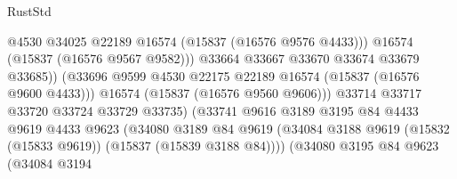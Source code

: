 \begin{lexlean}{RustStd}
\begin{coremodule}
{\begin{coremodule}
{{{{{{{{{{{{{{{{{{{{{{{{{{{{{{{{{{{{{{{{{{{{{{{{{{{{{{{{{{{{                                                @4530
                                                @34025
                                                @22189
                                                @16574
                                                (@15837 (@16576 @9576 @4433)))
                                              @16574
                                              (@15837 (@16576 @9567 @9582)))
                                            @33664
                                            @33667
                                            @33670
                                            @33674
                                            @33679
                                            @33685))
                                        (@33696
                                          @9599
                                          @4530
                                          @22175
                                          @22189
                                          @16574
                                          (@15837 (@16576 @9600 @4433)))
                                        @16574
                                        (@15837 (@16576 @9560 @9606)))
                                      @33714
                                      @33717
                                      @33720
                                      @33724
                                      @33729
                                      @33735)
                                    (@33741
                                      @9616
                                      @3189
                                      @3195
                                      @84
                                      @4433
                                      @9619
                                      @4433
                                      @9623
                                      (@34080
                                        @3189
                                        @84
                                        @9619
                                        (@34084
                                          @3188
                                          @9619
                                          (@15832 (@15833 @9619))
                                          (@15837 (@15839 @3188 @84))))
                                      (@34080
                                        @3195
                                        @84
                                        @9623
                                        (@34084
                                          @3194
}}}}}}}}}}}}}}}}}}}}}}}}}}}}}}}}}}}}}}}}}}}}}}}}}}}}}}}}}}}}
\end{coremodule}}
\end{coremodule}
\end{lexlean}
